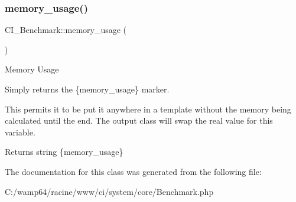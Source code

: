 \subsubsection{\texorpdfstring{memory\+\_\+usage()}{memory\_usage()}}
{\footnotesize\ttfamily C\+I\+\_\+\+Benchmark\+::memory\+\_\+usage (\begin{DoxyParamCaption}{ }\end{DoxyParamCaption})}

Memory Usage

Simply returns the \{memory\+\_\+usage\} marker.

This permits it to be put it anywhere in a template without the memory being calculated until the end. The output class will swap the real value for this variable.

\begin{DoxyReturn}{Returns}
string \textquotesingle{}\{memory\+\_\+usage\}\textquotesingle{} 
\end{DoxyReturn}


The documentation for this class was generated from the following file\+:\begin{DoxyCompactItemize}
\item 
C\+:/wamp64/racine/www/ci/system/core/Benchmark.\+php\end{DoxyCompactItemize}
